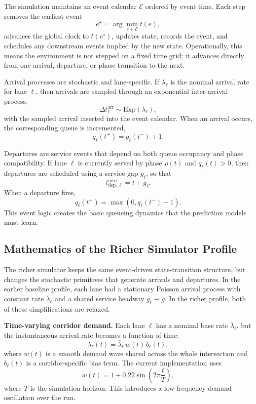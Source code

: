 \documentclass[11pt]{article}
\begin{document}
The simulation maintains an event calendar \(\mathcal{E}\) ordered by event time. Each step removes the earliest event
\[
e^\star = \arg\min_{e \in \mathcal{E}} t(e),
\]
advances the global clock to \(t(e^\star)\), updates state, records the event, and schedules any downstream events implied by the new state. Operationally, this means the environment is not stepped on a fixed time grid; it advances directly from one arrival, departure, or phase transition to the next.

Arrival processes are stochastic and lane-specific. If \(\lambda_\ell\) is the nominal arrival rate for lane \(\ell\), then arrivals are sampled through an exponential inter-arrival process,
\[
\Delta t_{\ell}^{\mathrm{arr}} \sim \mathrm{Exp}(\lambda_\ell),
\]
with the sampled arrival inserted into the event calendar. When an arrival occurs, the corresponding queue is incremented,
\[
q_\ell(t^+) = q_\ell(t^-) + 1.
\]

Departures are service events that depend on both queue occupancy and phase compatibility. If lane \(\ell\) is currently served by phase \(\rho(t)\) and \(q_\ell(t)>0\), then departures are scheduled using a service gap \(g_\ell\), so that
\[
t_{\mathrm{dep},\ell}^{\mathrm{next}} = t + g_\ell.
\]
When a departure fires,
\[
q_\ell(t^+) = \max(0, q_\ell(t^-) - 1).
\]
This event logic creates the basic queueing dynamics that the prediction models must learn.

\subsection*{Mathematics of the Richer Simulator Profile}

The richer simulator keeps the same event-driven state-transition structure, but changes the stochastic primitives that generate arrivals and departures. In the earlier baseline profile, each lane had a stationary Poisson arrival process with constant rate \(\lambda_\ell\) and a shared service headway \(g_\ell \equiv g\). In the richer profile, both of these simplifications are relaxed.

\textbf{Time-varying corridor demand.}
Each lane \(\ell\) has a nominal base rate \(\bar{\lambda}_\ell\), but the instantaneous arrival rate becomes a function of time:
\[
\lambda_\ell(t) = \bar{\lambda}_\ell \, w(t)\, b_\ell(t),
\]
where \(w(t)\) is a smooth demand wave shared across the whole intersection and \(b_\ell(t)\) is a corridor-specific bias term. The current implementation uses
\[
w(t) = 1 + 0.22 \sin\!\left(2\pi \frac{t}{T}\right),
\]
where \(T\) is the simulation horizon. This introduces a low-frequency demand oscillation over the run.
\end{document}
